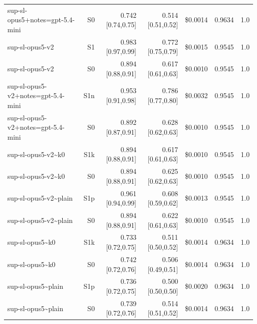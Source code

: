 \documentclass[11pt]{article}
\begin{document}
{\begin{longtable}{lrrrrrr}
sup-sl-opus5+notes=gpt-5.4-mini & S0 & 0.742 [0.74,0.75] & 0.514 [0.51,0.52] & \$0.0014 & 0.9634 & 1.0 \\
sup-sl-opus5-v2 & S1 & 0.983 [0.97,0.99] & 0.772 [0.75,0.79] & \$0.0015 & 0.9545 & 1.0 \\
sup-sl-opus5-v2 & S0 & 0.894 [0.88,0.91] & 0.617 [0.61,0.63] & \$0.0010 & 0.9545 & 1.0 \\
sup-sl-opus5-v2+notes=gpt-5.4-mini & S1n & 0.953 [0.91,0.98] & 0.786 [0.77,0.80] & \$0.0032 & 0.9545 & 1.0 \\
sup-sl-opus5-v2+notes=gpt-5.4-mini & S0 & 0.892 [0.87,0.91] & 0.628 [0.62,0.63] & \$0.0010 & 0.9545 & 1.0 \\
sup-sl-opus5-v2\textasciitilde{}k0 & S1k & 0.894 [0.88,0.91] & 0.617 [0.61,0.63] & \$0.0010 & 0.9545 & 1.0 \\
sup-sl-opus5-v2\textasciitilde{}k0 & S0 & 0.894 [0.88,0.91] & 0.625 [0.62,0.63] & \$0.0010 & 0.9545 & 1.0 \\
sup-sl-opus5-v2\textasciitilde{}plain & S1p & 0.961 [0.94,0.99] & 0.608 [0.59,0.62] & \$0.0013 & 0.9545 & 1.0 \\
sup-sl-opus5-v2\textasciitilde{}plain & S0 & 0.894 [0.88,0.91] & 0.622 [0.61,0.63] & \$0.0010 & 0.9545 & 1.0 \\
sup-sl-opus5\textasciitilde{}k0 & S1k & 0.733 [0.72,0.75] & 0.511 [0.50,0.52] & \$0.0014 & 0.9634 & 1.0 \\
sup-sl-opus5\textasciitilde{}k0 & S0 & 0.742 [0.72,0.76] & 0.506 [0.49,0.51] & \$0.0014 & 0.9634 & 1.0 \\
sup-sl-opus5\textasciitilde{}plain & S1p & 0.736 [0.72,0.75] & 0.500 [0.50,0.50] & \$0.0020 & 0.9634 & 1.0 \\
sup-sl-opus5\textasciitilde{}plain & S0 & 0.739 [0.72,0.76] & 0.514 [0.51,0.52] & \$0.0014 & 0.9634 & 1.0 \\
\end{longtable}}
\end{document}
